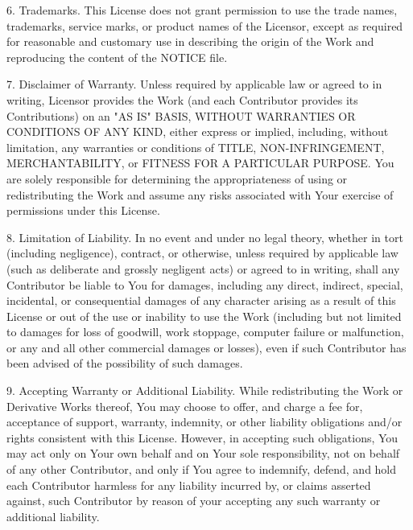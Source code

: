\begin{flushleft}
   6. Trademarks. This License does not grant permission to use the trade
      names, trademarks, service marks, or product names of the Licensor,
      except as required for reasonable and customary use in describing the
      origin of the Work and reproducing the content of the NOTICE file.

   7. Disclaimer of Warranty. Unless required by applicable law or
      agreed to in writing, Licensor provides the Work (and each
      Contributor provides its Contributions) on an "AS IS" BASIS,
      WITHOUT WARRANTIES OR CONDITIONS OF ANY KIND, either express or
      implied, including, without limitation, any warranties or conditions
      of TITLE, NON-INFRINGEMENT, MERCHANTABILITY, or FITNESS FOR A
      PARTICULAR PURPOSE. You are solely responsible for determining the
      appropriateness of using or redistributing the Work and assume any
      risks associated with Your exercise of permissions under this License.

   8. Limitation of Liability. In no event and under no legal theory,
      whether in tort (including negligence), contract, or otherwise,
      unless required by applicable law (such as deliberate and grossly
      negligent acts) or agreed to in writing, shall any Contributor be
      liable to You for damages, including any direct, indirect, special,
      incidental, or consequential damages of any character arising as a
      result of this License or out of the use or inability to use the
      Work (including but not limited to damages for loss of goodwill,
      work stoppage, computer failure or malfunction, or any and all
      other commercial damages or losses), even if such Contributor
      has been advised of the possibility of such damages.

   9. Accepting Warranty or Additional Liability. While redistributing
      the Work or Derivative Works thereof, You may choose to offer,
      and charge a fee for, acceptance of support, warranty, indemnity,
      or other liability obligations and/or rights consistent with this
      License. However, in accepting such obligations, You may act only
      on Your own behalf and on Your sole responsibility, not on behalf
      of any other Contributor, and only if You agree to indemnify,
      defend, and hold each Contributor harmless for any liability
      incurred by, or claims asserted against, such Contributor by reason
      of your accepting any such warranty or additional liability.

\end{flushleft}